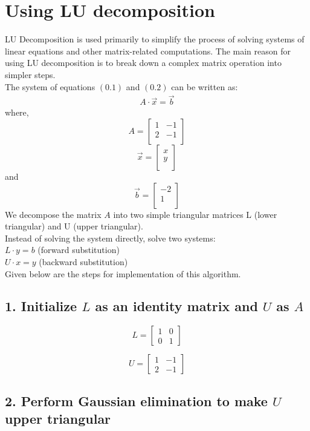 \documentclass[journal]{IEEEtran}
\begin{document}
\section*{Using LU decomposition}
LU Decomposition is used primarily to simplify the process of solving systems of linear equations and other matrix-related computations. The main reason for using LU decomposition is to break down a complex matrix operation into simpler steps. \\
The system of equations $(0.1)$ and $(0.2)$ can be written as:
\begin{align}
    A \cdot \vec{x} =\vec{b}
\end{align}
where,\\
\[
A = 
\begin{bmatrix}
1 & -1 \\
2 & -1 \\
\end{bmatrix}
\]
\[
\vec{x} =
\begin{bmatrix}
    x\\
    y\\
\end{bmatrix}
\] and
\[
\vec{b}=
\begin{bmatrix}
-2\\
1\\
\end{bmatrix}
\]
We decompose the matrix $A$ into two simple triangular matrices L (lower triangular) and U (upper triangular).\\
Instead of solving the system directly, solve two systems:\\
$L\cdot y = b$ (forward substitution)\\
$U\cdot x = y$ (backward substitution)\\
Given below are the steps for implementation of this algorithm.
\subsection*{1. Initialize $ L$ as an identity matrix and $ U $ as $ A $}

\[
L =
\begin{bmatrix}
1 & 0 \\
0 & 1
\end{bmatrix}
\]

\[
U =
\begin{bmatrix}
1 & -1 \\
2 & -1
\end{bmatrix}
\]

\subsection*{2. Perform Gaussian elimination to make $ U $ upper triangular}
\end{document}
